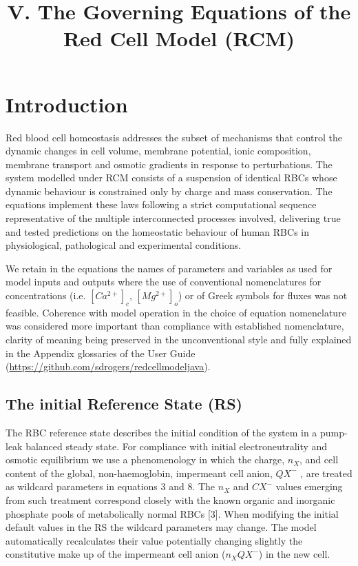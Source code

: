 \documentclass[a4paper]{article}
\title{V. The Governing Equations of the Red Cell Model (RCM)}
\date{}
\makeatletter
\renewcommand\maketitle
  {\noindent
   {\Large\bfseries\@title}%
   \medskip\par\noindent
   {\large\bfseries\@author}%
   \hfill
   {\large\@date}%
   \bigskip\par\noindent
  }
\newcommand{\cell}[1]{C#1}
\newcommand{\nX}{n_{X}}
\newcommand{\CXm}{\cell{X^{-}}}
\newcommand{\QXm}{QX^{-}}
\makeatother
\begin{document}
\setcounter{page}{28}

\maketitle

\section{Introduction}\label{introduction}

Red blood cell homeostasis addresses the subset of mechanisms that
control the dynamic changes in cell volume, membrane potential, ionic
composition, membrane transport and osmotic gradients in response to
perturbations. The system modelled under RCM consists of a suspension of identical
RBCs whose dynamic behaviour is constrained only by charge and mass
conservation. The equations implement these laws following a strict
computational sequence representative of the multiple interconnected
processes involved, delivering true and tested predictions on the
homeostatic behaviour of human RBCs in physiological, pathological and
experimental conditions.

We retain in the equations the names of parameters and variables as used for model inputs and outputs where the use of conventional nomenclatures for concentrations (i.e. $[Ca^{2+}]_c$, $[Mg^{2+}]_o$) or of Greek symbols for fluxes was not feasible.  Coherence with model operation in the choice of equation nomenclature was considered more important than compliance with established nomenclature, clarity of meaning being preserved in the unconventional style and fully explained in the Appendix glossaries of the User Guide (\url{https://github.com/sdrogers/redcellmodeljava}).


\subsection{The initial Reference State (RS)}

The RBC reference state describes the initial condition of the system in
a pump-leak balanced steady state. For compliance with initial
electroneutrality and osmotic equilibrium we use a phenomenology in
which the charge, $\nX$, and cell content of the global, non-haemoglobin,
impermeant cell anion, $\QXm$ , are treated as wildcard parameters in
equations 3 and 8. The $\nX$ and $\CXm$ values emerging from such treatment
correspond closely with the known organic and inorganic phosphate pools
of metabolically normal RBCs {[}3{]}. When modifying the initial default
values in the RS the wildcard parameters may change. The model
automatically recalculates their value potentially changing slightly the
constitutive make up of the impermeant cell anion ($\nX  \QXm$) in
the new cell.
\end{document}
